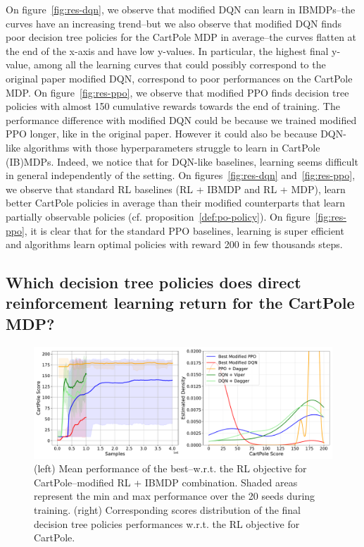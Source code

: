 On figure~\ref{fig:res-dqn}, we observe that modified DQN can learn in IBMDPs--the curves have an increasing trend--but we also observe that modified DQN finds poor decision tree policies for the CartPole MDP in average--the curves flatten at the end of the x-axis and have low y-values.
In particular, the highest final y-value, among all the learning curves that could possibly correspond to the original paper modified DQN, correspond to poor performances on the CartPole MDP.
On figure~\ref{fig:res-ppo}, we observe that modified PPO finds decision tree policies with almost 150 cumulative rewards towards the end of training.
The performance difference with modified DQN could be because we trained modified PPO longer, like in the original paper.
However it could also be because DQN-like algorithms with those hyperparameters struggle to learn in CartPole (IB)MDPs.
Indeed, we notice that for DQN-like baselines, learning seems difficult in general independently of the setting.
On figures~\ref{fig:res-dqn} and~\ref{fig:res-ppo}, we observe that standard RL baselines (RL + IBMDP and RL + MDP), learn better CartPole policies in average than their modified counterparts that learn partially observable policies (cf. proposition~\ref{def:po-policy}). 
On figure~\ref{fig:res-ppo}, it is clear that for the standard PPO baselines, learning is super efficient and algorithms learn optimal policies with reward 200 in few thousands steps.

\subsection{Which decision tree policies does direct reinforcement learning return for the CartPole MDP?}

\begin{figure}
    \centering
    \includegraphics[width=1\textwidth]{images/images_part1/ppo_tree_study.pdf}
    \caption{(left) Mean performance of the best--w.r.t. the RL objective for CartPole--modified RL + IBMDP combination. Shaded areas represent the min and max performance over the 20 seeds during training. (right) Corresponding scores distribution of the final decision tree policies performances w.r.t. the RL objective for CartPole.}\label{fig:ppo-trees}
\end{figure}


